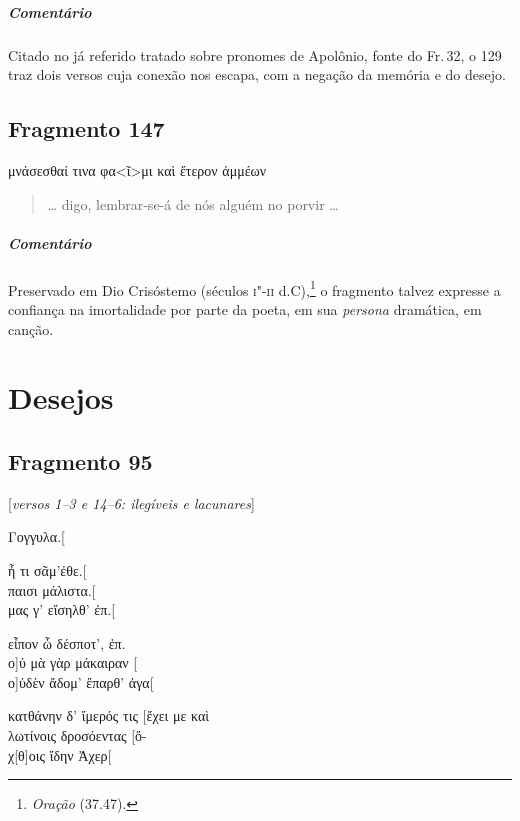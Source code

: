 \medskip

\paragraph{Comentário}
Citado no já referido tratado sobre pronomes de Apolônio, fonte do Fr.\,32, o 129 traz dois versos cuja conexão nos escapa, com a negação da memória e do desejo.


\section{Fragmento 147}

\begin{gkverse}
μνάσεσθαί τινα φα<ῖ>μι \dagger{}καὶ ἔτερον\dagger{} ἀμμέων
\end{gkverse}

\begin{verse}
\ldots{} digo, lembrar-se-á de nós alguém no porvir \ldots{}
\end{verse}

\medskip

{\paragraph{Comentário} Preservado em Dio Crisóstemo (séculos \textsc{i"-ii} d.C),\footnote{\textit{Oração} (37.47).} o fragmento talvez expresse a confiança na imortalidade por parte da poeta, em sua \textit{persona} dramática, em canção.}


\chapter{Desejos}

\section{Fragmento 95}

\begin{gkverse}
\textnormal{[\textit{versos 1--3 e 14--6: ilegíveis e lacunares}]}

Γογγυλα.[

ἦ τι σᾶμ’ἐθε.[\\
παισι μάλιστα.[\\
μας γ’ εἴσηλθ’ ἐπ.[

εἶπον ὦ δέσποτ’, ἐπ.\\
ο]ὐ μὰ γὰρ μάκαιραν [\\
ο]ὐδὲν ἄδομ’ ἔπαρθ’ ἀγα[

κατθάνην δ’ ἴμερός τις [ἔχει με καὶ\\
λωτίνοις δροσόεντας [ὄ-\\
χ[θ]οις ἴδην Ἀχερ[
\end{gkverse}

